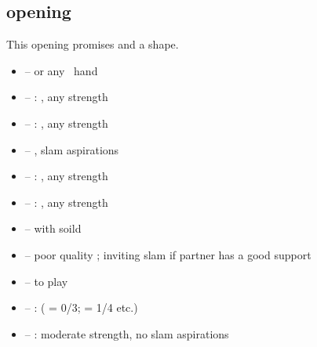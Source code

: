 \subsection{\ctr{1\nt} opening}
\label{subsec:1nt-op}

This opening promises  and a \bal\/ shape. \vspace{1em}

\begin{itemize}
  \item \ctr{2\c} -- \hyperref[subsec:stayman]{}  or any \inv\ hand
  \item \ctr{2\d} -- : , any strength
  \item \ctr{2\h} -- : , any strength
  \item \ctr{2\s} -- \hyperref[subsec:minor-stayman]{} , slam aspirations
  \item \ctr{2\nt} -- : , any strength
  \item \ctr{3\c} -- : , any strength
  \item \ctr{3\d} -- \inv\/ with soild  
  \item \ctr{3\major} -- \gf\/ poor quality ; inviting slam if partner has a good support
  \item \ctr{3\nt} -- \nat\/ to play
  \item \ctr{4\c} -- :  ( = 0/3;  = 1/4 etc.)
  \item \ctr{4\d/\h} -- :  moderate strength, no slam aspirations
\end{itemize}
